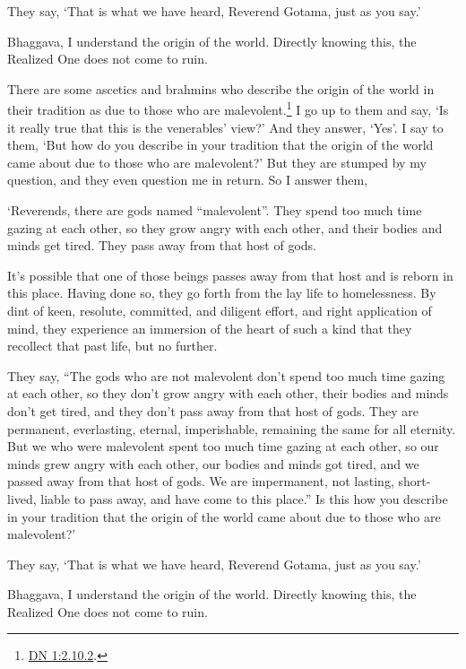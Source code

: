 \documentclass[12pt,openany]{book}%
\begin{document}
They say, ‘That is what we have heard, Reverend Gotama, just as you say.’ 

Bhaggava, I understand the origin of the world. Directly knowing this, the Realized One does not come to ruin. 

There are some ascetics and brahmins who describe the origin of the world in their tradition as due to those who are malevolent.\footnote{\href{https://suttacentral.net/dn1/en/sujato\#2.10.2}{DN 1:2.10.2}. } I go up to them and say, ‘Is it really true that this is the venerables’ view?’ And they answer, ‘Yes’. I say to them, ‘But how do you describe in your tradition that the origin of the world came about due to those who are malevolent?’ But they are stumped by my question, and they even question me in return. So I answer them, 

‘Reverends, there are gods named “malevolent”. They spend too much time gazing at each other, so they grow angry with each other, and their bodies and minds get tired. They pass away from that host of gods. 

It’s possible that one of those beings passes away from that host and is reborn in this place. Having done so, they go forth from the lay life to homelessness. By dint of keen, resolute, committed, and diligent effort, and right application of mind, they experience an immersion of the heart of such a kind that they recollect that past life, but no further. 

They say, “The gods who are not malevolent don’t spend too much time gazing at each other, so they don’t grow angry with each other, their bodies and minds don’t get tired, and they don’t pass away from that host of gods. They are permanent, everlasting, eternal, imperishable, remaining the same for all eternity. But we who were malevolent spent too much time gazing at each other, so our minds grew angry with each other, our bodies and minds got tired, and we passed away from that host of gods. We are impermanent, not lasting, short-lived, liable to pass away, and have come to this place.” Is this how you describe in your tradition that the origin of the world came about due to those who are malevolent?’ 

They say, ‘That is what we have heard, Reverend Gotama, just as you say.’ 

Bhaggava, I understand the origin of the world. Directly knowing this, the Realized One does not come to ruin. 
\end{document}
